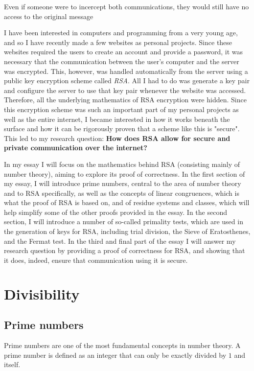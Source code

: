 \documentclass[12pt, titlepage]{article}
\begin{document}
    Even if someone were to incercept both communications, they would still have no access
    to the original message

    I have been interested in computers and programming from a very young age, and so I have
    recently made a few websites as personal projects. Since these websites required the
    users to create an account and provide a password, it was necessary that the
    communication between the user's computer and the server was encrypted. This, however,
    was handled automatically from the server using a public key encryption scheme called
    \emph{RSA}. All I had to do was generate a key pair and configure the server to use that
    key pair whenever the website was accessed.  Therefore, all the underlying mathematics
    of RSA encryption were hidden. Since this encryption scheme was such an important part
    of my personal projects as well as the entire internet, I became interested in how it
    works beneath the surface and how it can be rigorously proven that a scheme like this is
    "secure". This led to my research question: \textbf{How does RSA allow for secure and
    private communication over the internet?}

    In my essay I will focus on the mathematics behind RSA (consisting mainly of number
    theory), aiming to explore its proof of correctness. In the first section of my essay, I
    will introduce prime numbers, central to the area of number theory and to
    RSA specifically, as well as the concepts of linear congruences, which is what the proof
    of RSA is based on, and of residue systems and classes, which will help simplify some
    of the other proofs provided in the essay. In the second section, I will introduce a
    number of so-called primality tests, which are used in the generation of keys for RSA,
    including trial division, the Sieve of Eratosthenes, and the Fermat test. In the third
    and final part of the essay I will answer my research question by providing a proof of
    correctness for RSA, and showing that it does, indeed, ensure that communication using
    it is secure.

\section{Divisibility}
    \subsection{Prime numbers}
    Prime numbers are one of the most fundamental concepts in number theory. A prime number
    is defined as an integer that can only be exactly divided by $1$ and itself.
\end{document}
